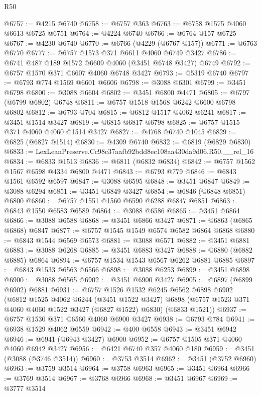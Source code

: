 \begin{lexlean}{R50}
\begin{coremodule}
@6757 := @4215 @6740
@6758 := @6757 @363
@6763 := @6758 @1575 @4060 @6613 @6725 @6751
@6764 := @4224 @6740
@6766 := @6764 @157 @6725
@6767 := @4230 @6740
@6770 := @6766 (@4229 (@6767 @157))
@6771 := @6763 @6770
@6777 := @6757 @1573 @371 @6611 @4060 @6749 @3427
@6786 := @6741 @487 @189 @1572 @6609 @4060 (@3451 @6748 @3427) @6749
@6792 := @6757 @1570 @371 @6607 @4060 @6748 @3427
@6793 := @5319 @6740
@6797 := @6793 @774 @1569 @6601 @6606
@6798 := @3088 @6301
@6799 := @3451 @6798
@6800 := @3088 @6604
@6802 := @3451 @6800 @4471
@6805 := @6797 (@6799 @6802) @6748
@6811 := @6757 @1518 @1568 @6242 @6600 @6798 @6802
@6812 := @6793 @704
@6815 := @6812 @1517 @4062 @6241
@6817 := @3451 @1514 @3427
@6819 := @6815 @6817 @6798
@6825 := @6757 @1515 @371 @4060 @4060 @1514 @3427
@6827 := @4768 @6740 @1045
@6829 := @6825 (@6827 @1514)
@6830 := @4309 @6740
@6832 := @6819 (@6829 @6830)
@6833 := LexLeanPreserve.Cc98c37aafb92bdd8ec108aa430da9d06.R50.__rel_16
@6834 := @6833 @1513
@6836 := @6811 (@6832 @6834)
@6842 := @6757 @1562 @1567 @6598 @4334 @6800 @4471
@6843 := @6793 @779
@6846 := @6843 @1561 @6592 @6597
@6847 := @3088 @6595
@6848 := @3451 @6847
@6849 := @3088 @6294
@6851 := @3451 @6849 @3427
@6854 := @6846 (@6848 @6851) @6800
@6860 := @6757 @1551 @1560 @6590 @6288 @6847 @6851
@6863 := @6843 @1550 @6583 @6589
@6864 := @3088 @6586
@6865 := @3451 @6864
@6866 := @3088 @6588
@6868 := @3451 @6866 @3427
@6871 := @6863 (@6865 @6868) @6847
@6877 := @6757 @1545 @1549 @6574 @6582 @6864 @6868
@6880 := @6843 @1544 @6569 @6573
@6881 := @3088 @6571
@6882 := @3451 @6881
@6883 := @3088 @6268
@6885 := @3451 @6883 @3427
@6888 := @6880 (@6882 @6885) @6864
@6894 := @6757 @1534 @1543 @6567 @6262 @6881 @6885
@6897 := @6843 @1533 @6563 @6566
@6898 := @3088 @6253
@6899 := @3451 @6898
@6900 := @3088 @6565
@6902 := @3451 @6900 @3427
@6905 := @6897 (@6899 @6902) @6881
@6931 := @6757
    @1526
    @1532
    @6245
    @6562
    @6898
    @6902
    (@6812
      @1525
      @4062
      @6244
      (@3451 @1522 @3427)
      @6898
      (@6757 @1523 @371 @4060 @4060 @1522 @3427 (@6827 @1522) @6830)
      (@6833 @1521))
@6937 := @6757 @1530 @371 @6560 @4060 @6900 @3427
@6938 := @6793 @784
@6941 := @6938 @1529 @4062 @6559
@6942 := @400 @6558
@6943 := @3451 @6942
@6946 := @6941 (@6943 @3427) @6900
@6952 := @6757 @1505 @371 @4060 @4060 @6942 @3427
@6956 := @6421 @6740 @357 @4060 @180
@6959 := @3451 (@3088 (@3746 @3514))
@6960 := @3753 @3514
@6962 := @3451 (@3752 @6960)
@6963 := @3759 @3514
@6964 := @3758 @6963
@6965 := @3451 @6964
@6966 := @3769 @3514
@6967 := @3768 @6966
@6968 := @3451 @6967
@6969 := @3777 @3514

\end{coremodule}
\end{lexlean}
